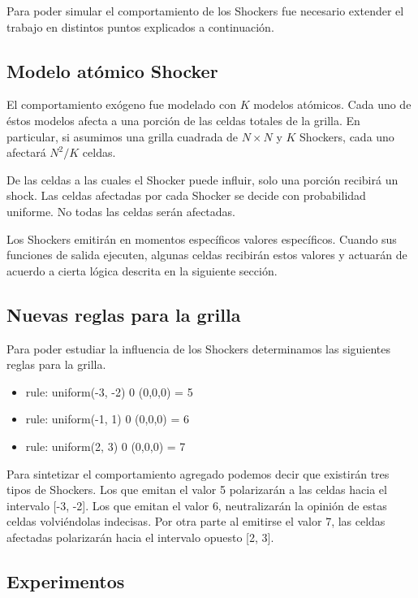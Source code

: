 Para poder simular el comportamiento de los Shockers fue necesario extender el trabajo en distintos puntos explicados a continuación.

\subsection{Modelo atómico Shocker}

El comportamiento exógeno fue modelado con $K$  modelos atómicos. Cada uno de éstos modelos afecta a una porción de las celdas totales de la grilla.
En particular, si asumimos una grilla cuadrada de $N \times N$ y $K$ Shockers, cada uno afectará $N^2/K$ celdas.

De las celdas a las cuales el Shocker puede influir, solo una porción recibirá un shock. Las celdas afectadas por cada Shocker se decide con probabilidad uniforme. No todas las celdas serán afectadas.

Los Shockers emitirán en momentos específicos valores específicos. Cuando sus funciones de salida ejecuten, algunas celdas recibirán estos valores y actuarán de acuerdo a cierta lógica descrita en la siguiente sección.


\subsection{Nuevas reglas para la grilla}

Para poder estudiar la influencia de los Shockers determinamos las siguientes reglas para la grilla.

\begin{itemize}
    \item rule: {  uniform(-3, -2) } 0 { (0,0,0) = 5 }
    \item rule: {  uniform(-1, 1)  } 0 { (0,0,0) = 6 }
    \item rule: {  uniform(2, 3) } 0 { (0,0,0) = 7 } 
\end{itemize}

Para sintetizar el comportamiento agregado podemos decir que existirán tres tipos de Shockers. Los que emitan el valor 5 polarizarán a las celdas hacia el intervalo [-3, -2]. Los que emitan el valor 6, neutralizarán la opinión de estas celdas volviéndolas indecisas. Por otra parte al emitirse el valor 7, las celdas afectadas polarizarán hacia el intervalo opuesto [2, 3].


\subsection{Experimentos}

